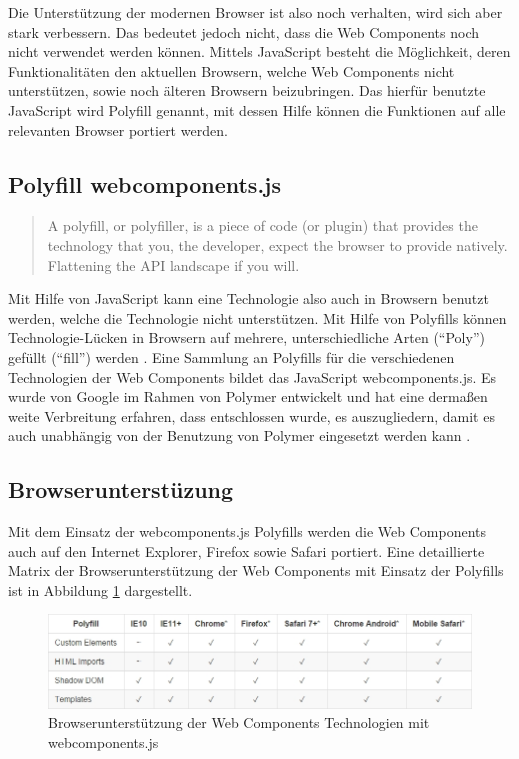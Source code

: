 Die Unterstützung der modernen Browser ist also noch verhalten, wird sich aber stark verbessern. Das bedeutet jedoch nicht, dass die Web Components noch nicht verwendet werden können. Mittels JavaScript besteht die Möglichkeit, deren Funktionalitäten den aktuellen Browsern, welche Web Components nicht unterstützen, sowie noch älteren Browsern beizubringen. Das hierfür benutzte JavaScript wird Polyfill genannt, mit dessen Hilfe können die Funktionen auf alle relevanten Browser portiert werden.


\subsection{Polyfill webcomponents.js}\label{polyfill-webcomponents.js}

\begin{quote}
A polyfill, or polyfiller, is a piece of code (or plugin) that provides the technology that you, the developer, expect the browser to provide natively. Flattening the \ac{API} landscape if you will. \cite{citeulike:13914241}
\end{quote}

Mit Hilfe von JavaScript kann eine Technologie also auch in Browsern benutzt werden, welche die Technologie nicht unterstützen. Mit Hilfe von Polyfills können Technologie-Lücken in Browsern auf mehrere, unterschiedliche Arten (``Poly'') gefüllt (``fill'') werden \cite{citeulike:13914234}. Eine Sammlung an Polyfills für die verschiedenen Technologien der Web Components bildet das JavaScript webcomponents.js. Es wurde von Google im Rahmen von Polymer entwickelt und hat eine dermaßen weite Verbreitung erfahren, dass entschlossen wurde, es auszugliedern, damit es auch unabhängig von der Benutzung von Polymer eingesetzt werden kann \cite{citeulike:13914239}.


\subsection{Browserunterstüzung}\label{polyfills-browserunterstuetzung}

Mit dem Einsatz der webcomponents.js Polyfills werden die Web Components auch auf den Internet Explorer, Firefox sowie Safari portiert. Eine detaillierte Matrix der Browserunterstützung der Web Components mit Einsatz der Polyfills ist in Abbildung \ref{fig:bdwctmwcjs} \cite{citeulike:13914238} dargestellt.

\begin{figure}[htbp]
 \centering
 \includegraphics[width=\linewidth]{kapitel2/bilder/6-webcomponentsjs-browserunterstuetzung}
 \caption{Browserunterstützung der Web Components Technologien mit webcomponents.js}
 \label{fig:bdwctmwcjs}
\end{figure}

